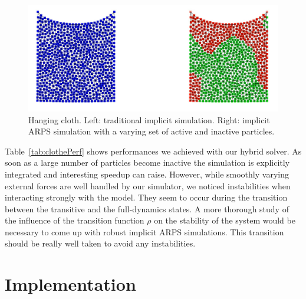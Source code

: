\begin{figure}[htb]
  \centering
  \includegraphics[width=1.0\linewidth]{images/arps-vriphys2013/Square3.jpg}
  \caption[ARPS: ARPS cloth simulation]{\label{fig:clothARPS} Hanging cloth. Left: traditional implicit simulation. Right: implicit ARPS simulation with a varying set of active and inactive particles. }
\end{figure}
Table~\ref{tab:clothePerf} shows performances we achieved with our hybrid solver.
As soon as a large number of particles become inactive the simulation is explicitly integrated and interesting speedup can raise.
\newline
However, while smoothly varying external forces are well handled by our simulator, we noticed instabilities when interacting strongly with the model.
They seem to occur during the transition between the transitive and the full-dynamics states.
A more thorough study of the influence of the transition function $\rho$ on the stability of the system would be necessary to come up with robust implicit ARPS simulations.
 This transition should be really well taken to avoid any instabilities.


\section{Implementation} \label{sec implementation}
